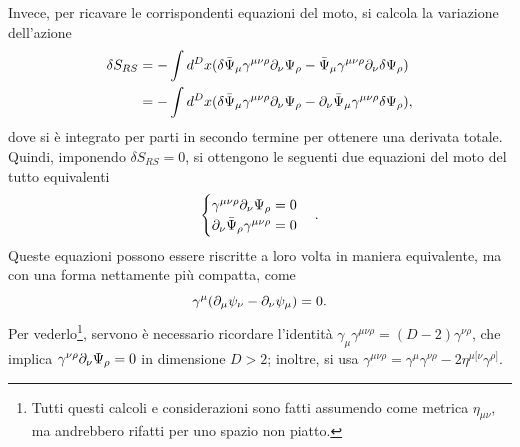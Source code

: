 Invece, per ricavare le corrispondenti equazioni del moto, si calcola la variazione dell'azione
\begin{equation}
    \begin{split}
        \delta S_{RS} &= -\int d^Dx (\delta\bar{\Psi}_\mu\gamma^{\mu\nu\rho}\partial_\nu\Psi_\rho - \bar{\Psi}_\mu\gamma^{\mu\nu\rho}\partial_\nu\delta\Psi_\rho) \\
        &= -\int d^Dx (\delta\bar{\Psi}_\mu\gamma^{\mu\nu\rho}\partial_\nu\Psi_\rho - \partial_\nu\bar{\Psi}_\mu\gamma^{\mu\nu\rho}\delta\Psi_\rho),
    \end{split}
\end{equation}
dove si è integrato per parti in secondo termine per ottenere una derivata totale. Quindi, imponendo $\delta S_{RS} = 0$, si ottengono le seguenti due equazioni del moto del tutto equivalenti
\begin{equation}
\label{eq: equazione del moto campo RS}
    \begin{cases}
        \gamma^{\mu\nu\rho}\partial_\nu\Psi_\rho = 0 \\
        \partial_\nu\bar{\Psi}_\rho\gamma^{\mu\nu\rho} = 0
    \end{cases}.
\end{equation} 
Queste equazioni possono essere riscritte a loro volta in maniera equivalente, ma con una forma nettamente più compatta, come 
\begin{equation}
\label{eq: equazione del moto campo RS (forma alternativa)}
    \gamma^\mu(\partial_\mu\psi_\nu - \partial_\nu\psi_\mu) = 0.
\end{equation}
Per vederlo\footnote{Tutti questi calcoli e considerazioni sono fatti assumendo come metrica $\eta_{\mu\nu}$, ma andrebbero rifatti per uno spazio non piatto.}, servono è necessario ricordare l'identità $\gamma_\mu\gamma^{\mu\nu\rho} = (D - 2)\gamma^{\nu\rho}$, che implica $\gamma^{\nu\rho}\partial_\nu\Psi_\rho = 0$ in dimensione $D > 2$; inoltre, si usa $\gamma^{\mu\nu\rho} = \gamma^\mu\gamma^{\nu\rho} - 2\eta^{\mu[\nu}\gamma^{\rho]}$.

